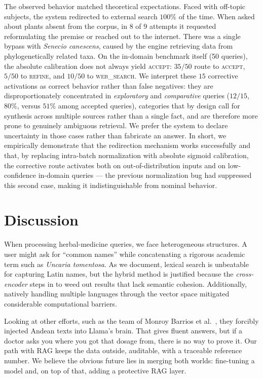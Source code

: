 \documentclass[runningheads]{llncs}
\begin{document}
The observed behavior matched theoretical expectations. Faced with off-topic subjects, the system redirected to external search $100\%$ of the time. When asked about plants absent from the corpus, in $8$ of $9$ attempts it requested reformulating the premise or reached out to the internet. There was a single bypass with \textit{Senecio canescens}, caused by the engine retrieving data from phylogenetically related taxa. On the in-domain benchmark itself (50 queries), the absolute calibration does not always yield \textsc{accept}: $35/50$ route to \textsc{accept}, $5/50$ to \textsc{refine}, and $10/50$ to \textsc{web\_search}. We interpret these $15$ corrective activations as correct behavior rather than false negatives: they are disproportionately concentrated in \textit{exploratory} and \textit{comparative} queries ($12/15$, $80\%$, versus $51\%$ among accepted queries), categories that by design call for synthesis across multiple sources rather than a single fact, and are therefore more prone to genuinely ambiguous retrieval. We prefer the system to declare uncertainty in those cases rather than fabricate an answer. In short, we empirically demonstrate that the redirection mechanism works successfully and that, by replacing intra-batch normalization with absolute sigmoid calibration, the corrective route activates both on out-of-distribution inputs and on low-confidence in-domain queries — the previous normalization bug had suppressed this second case, making it indistinguishable from nominal behavior.

\section{Discussion}
\label{sec:discussion}

When processing herbal-medicine queries, we face heterogeneous structures. A user might ask for ``common names'' while concatenating a rigorous academic term such as \textit{Uncaria tomentosa}. As we document, lexical search is unbeatable for capturing Latin names, but the hybrid method is justified because the \emph{cross-encoder} steps in to weed out results that lack semantic cohesion. Additionally, natively handling multiple languages through the vector space mitigated considerable computational barriers.

Looking at other efforts, such as the team of Monroy Barrios et al.~\cite{monroy2026finetuning}, they forcibly injected Andean texts into Llama's brain. That gives fluent answers, but if a doctor asks you where you got that dosage from, there is no way to prove it. Our path with RAG keeps the data outside, auditable, with a traceable reference number. We believe the obvious future lies in merging both worlds: fine-tuning a model and, on top of that, adding a protective RAG layer.
\end{document}
